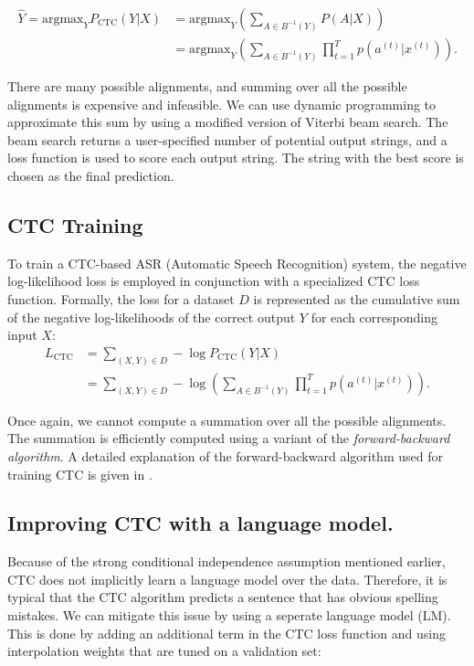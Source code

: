 \begin{align}
    \hat{Y} = \text{argmax}_Y P_{\text{CTC}}(Y|X) &= \text{argmax}_Y \left(\sum\limits_{A \in B^{-1}(Y)} P(A|X)\right) \\
                                                               &= \text{argmax}_Y \left(\sum\limits_{A \in B^{-1}(Y)} \prod\limits_{t=1}^{T} p(a^{(t)} | x^{(t)})\right).
\end{align}

There are many possible alignments, and summing over all the possible alignments is expensive and infeasible.
We can use dynamic programming to approximate this sum by using a modified version of Viterbi beam search. 
The beam search returns a user-specified number of potential output strings, 
and a loss function is used to score each output string.
The string with the best score is chosen as the final prediction.

\subsection{CTC Training}
To train a CTC-based ASR (Automatic Speech Recognition) system, 
the negative log-likelihood loss is employed in conjunction with 
a specialized CTC loss function. Formally, the loss for a dataset 
$D$ is represented as the cumulative sum of the negative log-likelihoods 
of the correct output $Y$ for each corresponding input $X$:
\begin{align}
    L_{\text{CTC}} &= \sum_{(X,Y) \in D} -\log P_{\text{CTC}}(Y|X) \\
                    &= \sum_{(X,Y) \in D} -\log \left( \sum_{A \in B^{-1}(Y)} \prod_{t=1}^{T} p(a^{(t)} | x^{(t)}) \right).
\end{align}

Once again, we cannot compute a summation over all the possible alignments.
The summation is efficiently computed using a variant of the \emph{forward-backward algorithm}.
A detailed explanation of the forward-backward algorithm used for training CTC is given in \cite{hannun2017sequence}.


\subsection{Improving CTC with a language model.} Because of the strong conditional independence assumption mentioned earlier,
CTC does not implicitly learn a language model over the data.
Therefore, it is typical that the CTC algorithm predicts a sentence that has obvious spelling mistakes.
We can mitigate this issue by using a seperate language model (LM).
This is done by adding an additional term in the CTC loss function and using interpolation weights that are tuned on a validation set:

